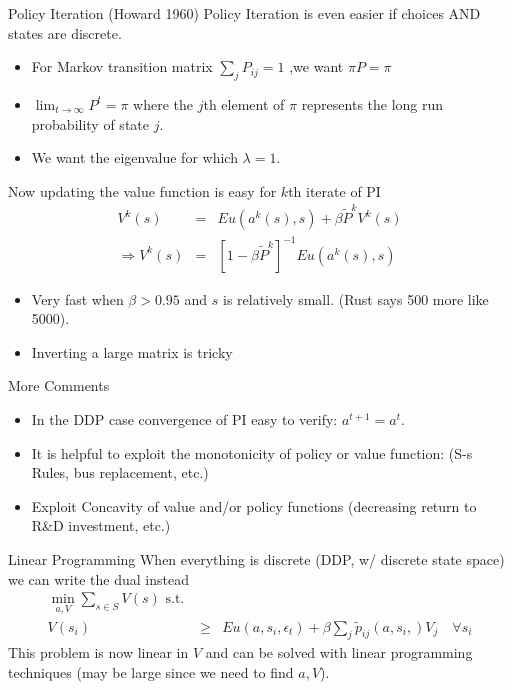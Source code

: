 \documentclass[xcolor=pdftex,dvipsnames,table,mathserif]{beamer}
\begin{document}
\begin{frame}{Policy Iteration (Howard 1960)}
Policy Iteration is even easier if choices AND states are discrete.
\begin{itemize}
\item For Markov transition matrix $\sum_j P_{ij} =1$ ,we want $\pi P = \pi$
\item $\lim_{t \rightarrow \infty} P^t = \pi$ where the $j$th element of $\pi$ represents the long run probability of state $j$.
\item We want the eigenvalue for which $\lambda = 1$.
\end{itemize}
Now updating the value function is easy for $k$th iterate of PI
\begin{eqnarray*}
V^k(s) &=& Eu(a^k(s),s) + \beta \tilde{P}^k V^k(s)\\
\Rightarrow V^k(s) &=& [1 - \beta \tilde{P}^k]^{-1} Eu(a^k(s),s)
\end{eqnarray*}
\begin{itemize}
\item Very fast when $\beta > 0.95$ and $s$ is relatively small. (Rust says 500 more like 5000).
\item Inverting a large matrix is tricky
\end{itemize}
\end{frame}


\begin{frame}{More Comments }
\begin{itemize}
\item In the DDP case convergence of PI easy to verify: $a^{t+1} = a^t$.
\item It is helpful to exploit the monotonicity of policy or value function: (S-s Rules, bus replacement, etc.)
\item Exploit Concavity of value and/or policy functions (decreasing return to R\&D investment, etc.) 
\end{itemize}
\end{frame}


\begin{frame}{Linear Programming}
When everything is discrete (DDP, w/ discrete state space) we can write the dual instead
\begin{eqnarray*}
\min_{a,V} \sum_{s \in S} V(s) \mbox{ s.t. }&& \\
V(s_i) &\geq& Eu(a,s_i,\epsilon_t)  + \beta \sum_j \tilde{p}_{ij}(a,s_i,) V_j \quad \forall s_i
\end{eqnarray*}
This problem is now linear in $V$ and can be solved with linear programming techniques (may be large since we need to find $a,V$).
\end{frame}
\end{document}
